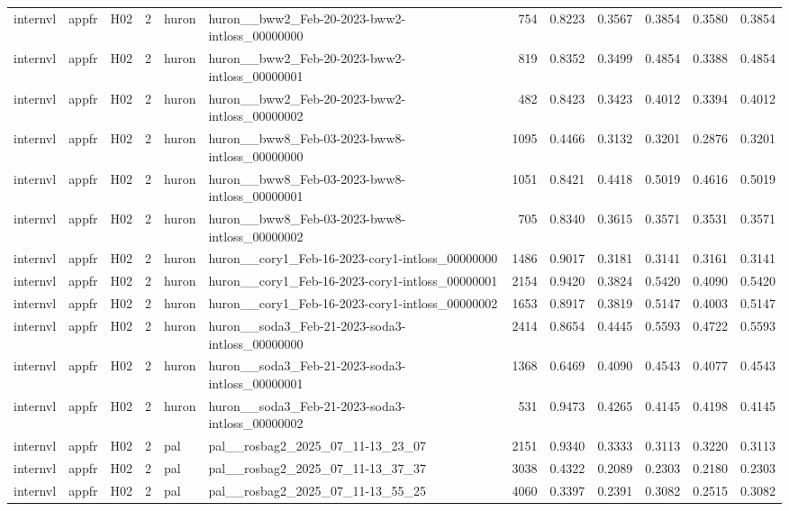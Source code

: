 \begin{table}[tbp]
\begin{tabular}{lllrllrrrrrr}
internvl & appfr & H02 & 2 & huron & huron\_\_bww2\_Feb-20-2023-bww2-intloss\_00000000 & 754 & 0.8223 & 0.3567 & 0.3854 & 0.3580 & 0.3854 \\
internvl & appfr & H02 & 2 & huron & huron\_\_bww2\_Feb-20-2023-bww2-intloss\_00000001 & 819 & 0.8352 & 0.3499 & 0.4854 & 0.3388 & 0.4854 \\
internvl & appfr & H02 & 2 & huron & huron\_\_bww2\_Feb-20-2023-bww2-intloss\_00000002 & 482 & 0.8423 & 0.3423 & 0.4012 & 0.3394 & 0.4012 \\
internvl & appfr & H02 & 2 & huron & huron\_\_bww8\_Feb-03-2023-bww8-intloss\_00000000 & 1095 & 0.4466 & 0.3132 & 0.3201 & 0.2876 & 0.3201 \\
internvl & appfr & H02 & 2 & huron & huron\_\_bww8\_Feb-03-2023-bww8-intloss\_00000001 & 1051 & 0.8421 & 0.4418 & 0.5019 & 0.4616 & 0.5019 \\
internvl & appfr & H02 & 2 & huron & huron\_\_bww8\_Feb-03-2023-bww8-intloss\_00000002 & 705 & 0.8340 & 0.3615 & 0.3571 & 0.3531 & 0.3571 \\
internvl & appfr & H02 & 2 & huron & huron\_\_cory1\_Feb-16-2023-cory1-intloss\_00000000 & 1486 & 0.9017 & 0.3181 & 0.3141 & 0.3161 & 0.3141 \\
internvl & appfr & H02 & 2 & huron & huron\_\_cory1\_Feb-16-2023-cory1-intloss\_00000001 & 2154 & 0.9420 & 0.3824 & 0.5420 & 0.4090 & 0.5420 \\
internvl & appfr & H02 & 2 & huron & huron\_\_cory1\_Feb-16-2023-cory1-intloss\_00000002 & 1653 & 0.8917 & 0.3819 & 0.5147 & 0.4003 & 0.5147 \\
internvl & appfr & H02 & 2 & huron & huron\_\_soda3\_Feb-21-2023-soda3-intloss\_00000000 & 2414 & 0.8654 & 0.4445 & 0.5593 & 0.4722 & 0.5593 \\
internvl & appfr & H02 & 2 & huron & huron\_\_soda3\_Feb-21-2023-soda3-intloss\_00000001 & 1368 & 0.6469 & 0.4090 & 0.4543 & 0.4077 & 0.4543 \\
internvl & appfr & H02 & 2 & huron & huron\_\_soda3\_Feb-21-2023-soda3-intloss\_00000002 & 531 & 0.9473 & 0.4265 & 0.4145 & 0.4198 & 0.4145 \\
internvl & appfr & H02 & 2 & pal & pal\_\_rosbag2\_2025\_07\_11-13\_23\_07 & 2151 & 0.9340 & 0.3333 & 0.3113 & 0.3220 & 0.3113 \\
internvl & appfr & H02 & 2 & pal & pal\_\_rosbag2\_2025\_07\_11-13\_37\_37 & 3038 & 0.4322 & 0.2089 & 0.2303 & 0.2180 & 0.2303 \\
internvl & appfr & H02 & 2 & pal & pal\_\_rosbag2\_2025\_07\_11-13\_55\_25 & 4060 & 0.3397 & 0.2391 & 0.3082 & 0.2515 & 0.3082 \\

\end{tabular}
\end{table}
